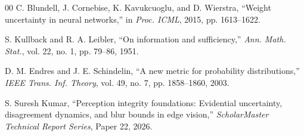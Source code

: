 \documentclass[conference]{IEEEtran}
\begin{document}
\begin{thebibliography}{00}
 C. Blundell, J. Cornebise, K. Kavukcuoglu, and D. Wierstra, ``Weight uncertainty in neural networks,'' in \emph{Proc. ICML}, 2015, pp. 1613--1622.

 S. Kullback and R. A. Leibler, ``On information and sufficiency,'' \emph{Ann. Math. Stat.}, vol. 22, no. 1, pp. 79--86, 1951.

 D. M. Endres and J. E. Schindelin, ``A new metric for probability distributions,'' \emph{IEEE Trans. Inf. Theory}, vol. 49, no. 7, pp. 1858--1860, 2003.

 S. Suresh Kumar, ``Perception integrity foundations: Evidential uncertainty, disagreement dynamics, and blur bounds in edge vision,'' \emph{ScholarMaster Technical Report Series}, Paper 22, 2026.

\end{thebibliography}
\end{document}
